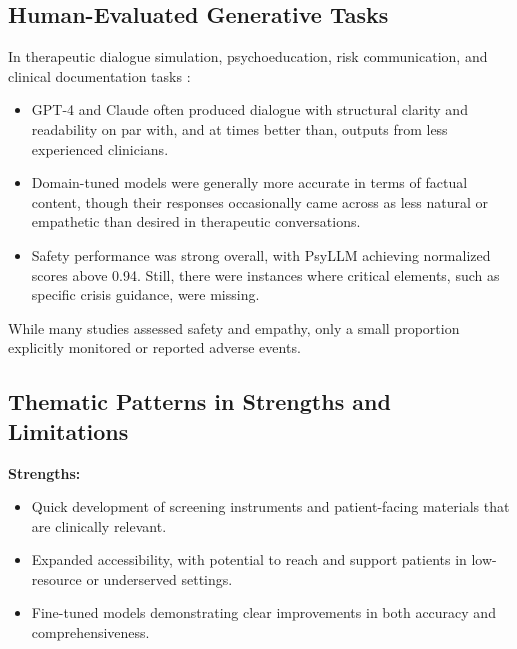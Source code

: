 \documentclass[sn-basic,authoryear]{sn-jnl}
\begin{document}
\subsection{Human-Evaluated Generative Tasks}
In therapeutic dialogue simulation, psychoeducation, risk communication, and clinical documentation tasks \citep{Hua2024b}:
\begin{itemize}
    \item GPT-4 and Claude often produced dialogue with structural clarity and readability on par with, and at times better than, outputs from less experienced clinicians.
    \item Domain-tuned models were generally more accurate in terms of factual content, though their responses occasionally came across as less natural or empathetic than desired in therapeutic conversations.
    \item Safety performance was strong overall, with PsyLLM achieving normalized scores above 0.94. Still, there were instances where critical elements, such as specific crisis guidance, were missing.
\end{itemize}
While many studies assessed safety and empathy, only a small proportion explicitly monitored or reported adverse events. 

\begin{table}
\centering
\caption{Adverse event reporting across included studies}
\label{tab:adverse_events}
\end{table}

\subsection{Thematic Patterns in Strengths and Limitations}
\textbf{Strengths:}
\begin{itemize}
    \item Quick development of screening instruments and patient-facing materials that are clinically relevant.
    \item Expanded accessibility, with potential to reach and support patients in low-resource or underserved settings.
    \item Fine-tuned models demonstrating clear improvements in both accuracy and comprehensiveness. 
\end{itemize}
\end{document}
